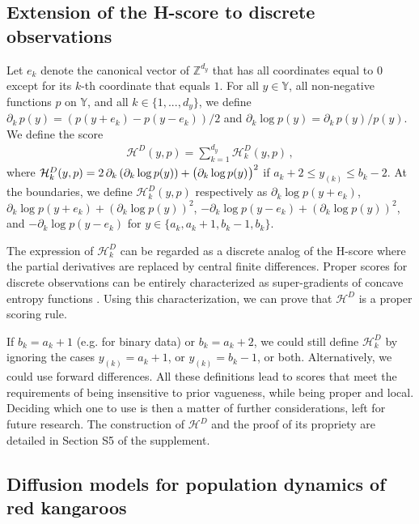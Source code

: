 \documentclass[12pt]{article}
\theoremstyle{plain}
\theoremstyle{definition}
\newcommand{\suppdiscretehscore}{ S5 }
\begin{document}
	\subsection{Extension of the H-score to discrete observations}
	\label{subsec:extension_hscore_discrete}
	Let $e_k$ denote the canonical vector of $\mathbb{Z}^{d_y}$ that has all coordinates equal to $0$ except for its
	$k$-th coordinate that equals $1$. For all $y\in\mathbb{Y}$, all non-negative functions $p$ on $\mathbb{Y}$, and all $k\in\{1,...,d_y\}$, we define $\partial_k\, p(y) = (p(y+e_k)-p(y-e_k))/2$ and $\partial_k \log p(y) = \partial_k\, p(y)/p(y)$. We define the score
	\begin{align}
	{\mathcal{H}^D}(y,p)=\sum_{k=1}^{d_y} \mathcal{H}^D_{k}(y,p)\,,
	\end{align}
	where $\mathcal{H}^D_{k}(y,p) = 2\,\partial_k\left(\partial_k \log p(y)\right) + \left(\partial_k \log p(y)^{\vphantom{S}}\right)^2$ if $a_k+2\leq y_{(k)} \leq b_k-2$. At the boundaries, we define $\mathcal{H}^D_{k}(y,p)$ respectively as $\partial_k \log p(y+e_k)$, $\partial_k \log p(y+e_k) + \left(\partial_k \log p(y)\right)^2$, $-\partial_k \log p(y-e_k) + \left(\partial_k \log p(y)\right)^2$, and $-\partial_k \log p(y-e_k)$ for $y\in\{a_k,a_k+1,b_k-1,b_k\}$. 
	
	The expression of ${\mathcal{H}_k^D}$ can be regarded as a discrete analog of
	the H-score where the partial derivatives are replaced by central finite
	differences. Proper scores for discrete observations can be entirely
	characterized as super-gradients of concave entropy functions
	\citep{McCarthy1956, hendrickson1971,dawid2012}. Using this characterization,
	we can prove that ${\mathcal{H}^D}$ is a proper scoring rule.  
	
	If $b_k = a_k + 1$ (e.g. for binary data) or $b_k = a_k + 2$, we could still
	define $\mathcal{H}^D_{k}$  by ignoring the cases
	$y_{(k)}=a_k+1$, or $y_{(k)}=b_k-1$, or both. Alternatively, we could use
	forward differences. All these definitions lead to scores that meet the requirements of
	being insensitive to prior vagueness, while being proper and local. Deciding
	which one to use is then a matter of further considerations, left for future research. The construction of ${\mathcal{H}^D}$ and
	the proof of its propriety are detailed in Section\suppdiscretehscore of the supplement. 
	
	\subsection{Diffusion models for population dynamics of red kangaroos}
	\label{example:applicationsKangaroos}
	
\end{document}
